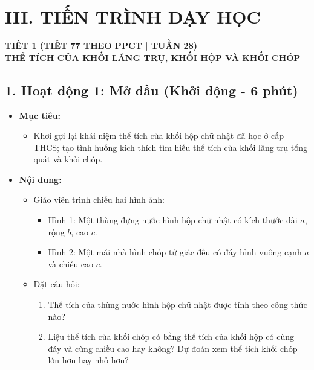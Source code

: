 \documentclass[12pt, a4paper]{article}
\begin{document}
\section*{III. TIẾN TRÌNH DẠY HỌC}

\begin{center}
    \textbf{\large TIẾT 1 (TIẾT 77 THEO PPCT | TUẦN 28)}\\[4pt]
    \textbf{\large THỂ TÍCH CỦA KHỐI LĂNG TRỤ, KHỐI HỘP VÀ KHỐI CHÓP}
\end{center}

\subsection*{1. Hoạt động 1: Mở đầu (Khởi động - 6 phút)}

\begin{itemize}[leftmargin=1.2cm]
    \item[a)] \textbf{Mục tiêu:}
    \begin{itemize}[leftmargin=0.6cm]
        \item Khơi gợi lại khái niệm thể tích của khối hộp chữ nhật đã học ở cấp THCS; tạo tình huống kích thích tìm hiểu thể tích của khối lăng trụ tổng quát và khối chóp.
    \end{itemize}

    \item[b)] \textbf{Nội dung:}
    \begin{itemize}[leftmargin=0.6cm]
        \item Giáo viên trình chiếu hai hình ảnh:
        \begin{itemize}
            \item Hình 1: Một thùng đựng nước hình hộp chữ nhật có kích thước dài $a$, rộng $b$, cao $c$.
            \item Hình 2: Một mái nhà hình chóp tứ giác đều có đáy hình vuông cạnh $a$ và chiều cao $c$.
        \end{itemize}
        \item Đặt câu hỏi:
        \begin{enumerate}
            \item Thể tích của thùng nước hình hộp chữ nhật được tính theo công thức nào?
            \item Liệu thể tích của khối chóp có bằng thể tích của khối hộp có cùng đáy và cùng chiều cao hay không? Dự đoán xem thể tích khối chóp lớn hơn hay nhỏ hơn?
        \end{enumerate}
    \end{itemize}


\end{itemize}
\end{document}

